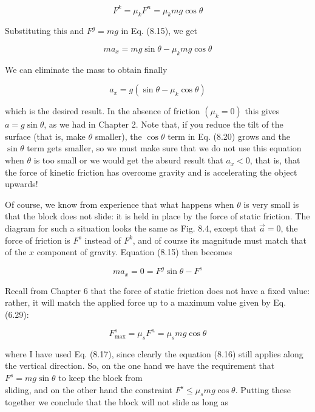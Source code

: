 \documentclass[10pt]{article}
\begin{document}
\begin{equation*}
F^{k}=\mu_{k} F^{n}=\mu_{k} m g \cos \theta \tag{8.18}
\end{equation*}


Substituting this and $F^{g}=m g$ in Eq. (8.15), we get


\begin{equation*}
m a_{x}=m g \sin \theta-\mu_{k} m g \cos \theta \tag{8.19}
\end{equation*}


We can eliminate the mass to obtain finally


\begin{equation*}
a_{x}=g\left(\sin \theta-\mu_{k} \cos \theta\right) \tag{8.20}
\end{equation*}


which is the desired result. In the absence of friction $\left(\mu_{k}=0\right)$ this gives $a=g \sin \theta$, as we had in Chapter 2. Note that, if you reduce the tilt of the surface (that is, make $\theta$ smaller), the $\cos \theta$ term in Eq. (8.20) grows and the $\sin \theta$ term gets smaller, so we must make sure that we do not use this equation when $\theta$ is too small or we would get the absurd result that $a_{x}<0$, that is, that the force of kinetic friction has overcome gravity and is accelerating the object upwards!

Of course, we know from experience that what happens when $\theta$ is very small is that the block does not slide: it is held in place by the force of static friction. The diagram for such a situation looks the same as Fig. 8.4, except that $\vec{a}=0$, the force of friction is $F^{s}$ instead of $F^{k}$, and of course its magnitude must match that of the $x$ component of gravity. Equation (8.15) then becomes


\begin{equation*}
m a_{x}=0=F^{g} \sin \theta-F^{s} \tag{8.21}
\end{equation*}


Recall from Chapter 6 that the force of static friction does not have a fixed value: rather, it will match the applied force up to a maximum value given by Eq. (6.29):


\begin{equation*}
F_{\max }^{s}=\mu_{s} F^{n}=\mu_{s} m g \cos \theta \tag{8.22}
\end{equation*}


where I have used Eq. (8.17), since clearly the equation (8.16) still applies along the vertical direction. So, on the one hand we have the requirement that $F^{s}=m g \sin \theta$ to keep the block from\\
sliding, and on the other hand the constraint $F^{s} \leq \mu_{s} m g \cos \theta$. Putting these together we conclude that the block will not slide as long as
\end{document}
